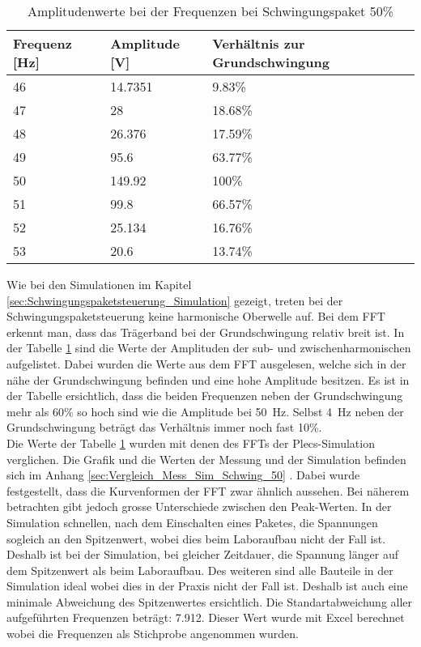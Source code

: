 \newpage
\begin{table}[ht!]
	\centering
	\begin{tabular}{|l|l|l|}
		\hline
		Frequenz {[}Hz{]} & Amplitude {[}V{]} & Verhältnis zur Grundschwingung \\ \hline
		46                & 14.7351           & 9.83\%                         \\ \hline
		47                & 28                & 18.68\%                        \\ \hline
		48                & 26.376            & 17.59\%                        \\ \hline
		49                & 95.6              & 63.77\%                        \\ \hline
		50                & 149.92            & 100\%                          \\ \hline
		51                & 99.8              & 66.57\%                        \\ \hline
		52                & 25.134            & 16.76\%                        \\ \hline
		53                & 20.6              & 13.74\%                        \\ \hline
	\end{tabular}
\caption{Amplitudenwerte bei der Frequenzen bei Schwingungspaket 50\%}\label{tab:Mess_Spannung_Schwing_50}
\end{table}
Wie bei den Simulationen im Kapitel \ref{sec:Schwingungspaketsteuerung_Simulation} gezeigt, treten bei der Schwingungspaketsteuerung keine harmonische Oberwelle auf. Bei dem FFT erkennt man, dass das Trägerband bei der Grundschwingung relativ breit ist. In der Tabelle \ref{tab:Mess_Spannung_Schwing_50} sind die Werte der Amplituden der sub- und zwischenharmonischen aufgelistet. Dabei wurden die Werte aus dem FFT ausgelesen, welche sich in der nähe der Grundschwingung befinden und eine hohe Amplitude besitzen. 
Es ist in der Tabelle ersichtlich, dass die beiden Frequenzen neben der Grundschwingung mehr als 60\% so hoch sind wie die Amplitude bei \SI{50}{Hz}. Selbst \SI{4}{Hz} neben der Grundschwingung beträgt das Verhältnis immer noch fast 10\%.\\
Die Werte der Tabelle \ref{tab:Mess_Spannung_Schwing_50} wurden mit denen des FFTs der Plecs-Simulation verglichen. Die Grafik und die Werten der Messung und der Simulation befinden sich im Anhang \ref{sec:Vergleich_Mess_Sim_Schwing_50} . Dabei wurde festgestellt, dass die Kurvenformen der FFT zwar ähnlich aussehen. Bei näherem betrachten gibt jedoch grosse Unterschiede zwischen den Peak-Werten. In der Simulation schnellen, nach dem Einschalten eines Paketes, die Spannungen sogleich an den Spitzenwert, wobei dies beim Laboraufbau nicht der Fall ist. Deshalb ist bei der Simulation, bei gleicher Zeitdauer, die Spannung länger auf dem Spitzenwert als beim Laboraufbau. Des weiteren sind alle Bauteile in der Simulation ideal wobei dies in der Praxis nicht der Fall ist. Deshalb ist auch eine minimale Abweichung des Spitzenwertes ersichtlich. Die Standartabweichung aller aufgeführten Frequenzen beträgt: 7.912. Dieser Wert wurde mit Excel berechnet wobei die Frequenzen als Stichprobe angenommen wurden. 


